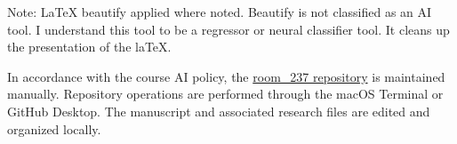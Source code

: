 \documentclass[12pt,letterpaper]{article}
\begin{document}
Note:
LaTeX beautify applied where noted. 
Beautify is not classified as an AI tool. 
I understand this tool to be a regressor or neural classifier tool. 
It cleans up the presentation of the laTeX. 

In accordance with the course AI policy, the
\href{https://github.com/pskeffington/room_237}
{room\_237 repository} is maintained manually.
Repository operations are performed through the macOS
Terminal or GitHub Desktop. The manuscript and associated
research files are edited and organized locally.


\newpage


\printbibliography[title={References}]
\end{document}
